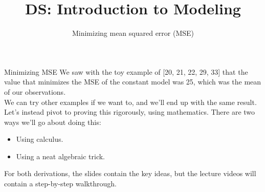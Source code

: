 \documentclass[aspectratio=169]{../latex_main/tntbeamer}  %
\title[Introduction]{DS: Introduction to Modeling}
\subtitle{Minimizing mean squared error (MSE)}
\begin{document}
	
	\maketitle
	\begin{frame}{Minimizing MSE}
	    We saw with the toy example of [20, 21, 22, 29, 33] that the value that minimizes the MSE of the constant model was 25, which was the mean of our observations.\\
	    \bigskip
	    We can try other examples if we want to, and we’ll end up with the same result. Let’s instead pivot to proving this rigorously, using mathematics. There are two ways we’ll go about doing this:
	    \begin{itemize}
	        \item Using calculus.
	        \item Using a neat algebraic trick.
	    \end{itemize}
	    \bigskip
	    For both derivations, the slides contain the key ideas, but the lecture videos will contain a step-by-step walkthrough.
	\end{frame}
	
\end{document}
